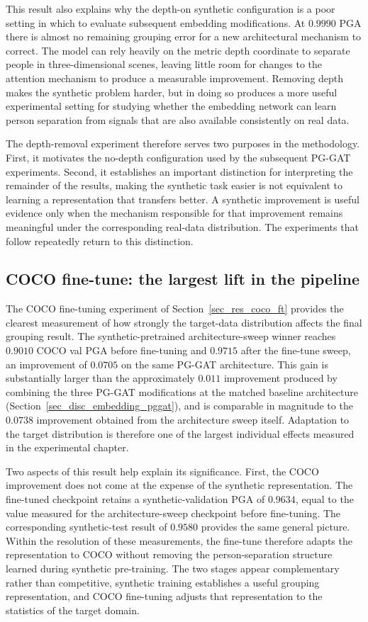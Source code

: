 This result also explains why the depth-on synthetic configuration is a
poor setting in which to evaluate subsequent embedding modifications.
At $0.9990$ PGA there is almost no remaining grouping error for a new
architectural mechanism to correct.
The model can rely heavily on the metric depth coordinate to separate
people in three-dimensional scenes,
leaving little room for changes to the attention mechanism to produce a
measurable improvement.
Removing depth makes the synthetic problem harder,
but in doing so produces a more useful experimental setting for studying
whether the embedding network can learn person separation from signals
that are also available consistently on real data.

The depth-removal experiment therefore serves two purposes in the
methodology.
First, it motivates the no-depth configuration used by the subsequent
PG-GAT experiments.
Second, it establishes an important distinction for interpreting the
remainder of the results,
making the synthetic task easier is not equivalent to learning a
representation that transfers better.
A synthetic improvement is useful evidence only when the mechanism
responsible for that improvement remains meaningful under the
corresponding real-data distribution.
The experiments that follow repeatedly return to this distinction.

\subsection{COCO fine-tune: the largest lift in the pipeline}
\label{sec_disc_transfer_finetune}

The COCO fine-tuning experiment of Section~\ref{sec_res_coco_ft}
provides the clearest measurement of how strongly the target-data
distribution affects the final grouping result.
The synthetic-pretrained architecture-sweep winner reaches $0.9010$
COCO val PGA before fine-tuning and $0.9715$ after the fine-tune sweep,
an improvement of $0.0705$ on the same PG-GAT architecture.
This gain is substantially larger than the approximately $0.011$
improvement produced by combining the three PG-GAT modifications
at the matched baseline architecture
(Section~\ref{sec_disc_embedding_pggat}),
and is comparable in magnitude to the $0.0738$ improvement obtained
from the architecture sweep itself.
Adaptation to the target distribution is therefore one of the largest
individual effects measured in the experimental chapter.

Two aspects of this result help explain its significance.
First, the COCO improvement does not come at the expense of the
synthetic representation.
The fine-tuned checkpoint retains a synthetic-validation PGA of
$0.9634$,
equal to the value measured for the architecture-sweep checkpoint
before fine-tuning.
The corresponding synthetic-test result of $0.9580$ provides the same
general picture.
Within the resolution of these measurements,
the fine-tune therefore adapts the representation to COCO without
removing the person-separation structure learned during synthetic
pre-training.
The two stages appear complementary rather than competitive,
synthetic training establishes a useful grouping representation,
and COCO fine-tuning adjusts that representation to the statistics
of the target domain.

